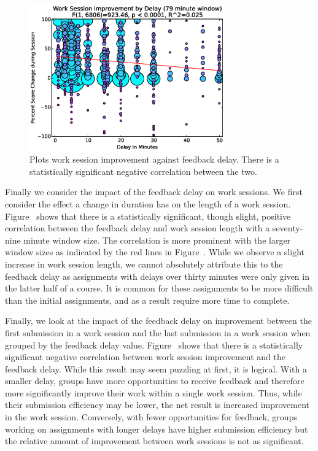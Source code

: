\begin{figure}[!t]
\centering
\includegraphics[width=3.3in]{graphs/Work_Session_Improvement_by_Delay_(79_minute_window).eps}
\caption{Plots work session improvement against feedback delay. There is a
  statistically significant negative correlation between the two.}
\end{figure}

Finally we consider the impact of the feedback delay on work sessions. We first
consider the effect a change in duration has on the length of a work
session. Figure~ shows that there is a
statistically significant, though slight, positive correlation between the
feedback delay and work session length with a seventy-nine minute window
size. The correlation is more prominent with the larger window sizes as
indicated by the red lines in Figure~. While we
observe a slight increase in work session length, we cannot absolutely
attribute this to the feedback delay as assignments with delays over thirty
minutes were only given in the latter half of a course. It is common for these
assignments to be more difficult than the initial assignments, and as a result
require more time to complete.

Finally, we look at the impact of the feedback delay on improvement between the
first submission in a work session and the last submission in a work session
when grouped by the feedback delay
value. Figure~ shows that there is a
statistically significant negative correlation between work session improvement
and the feedback delay. While this result may seem puzzling at first, it is
logical. With a smaller delay, groups have more opportunities to receive
feedback and therefore more significantly improve their work within a single
work session. Thus, while their submission efficiency may be lower, the net
result is increased improvement in the work session. Conversely, with fewer
opportunities for feedback, groups working on assignments with longer delays
have higher submission efficiency but the relative amount of improvement
between work sessions is not as significant.
